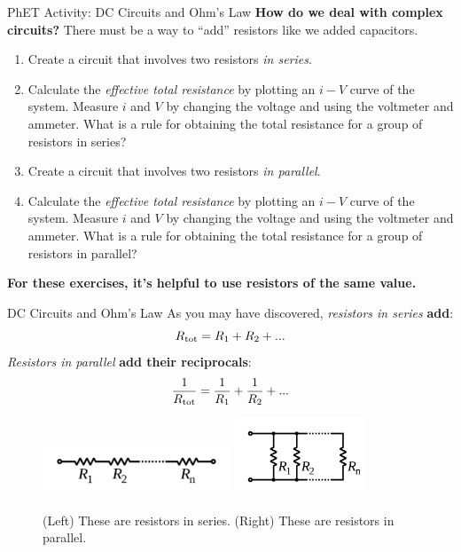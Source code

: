 \documentclass{beamer}
\begin{document}
\begin{frame}{PhET Activity: DC Circuits and Ohm's Law}
\small
\textbf{How do we deal with complex circuits?} There must be a way to ``add'' resistors like we added capacitors.
\begin{enumerate}
\item Create a circuit that involves two resistors \textit{in series}.
\item Calculate the \textit{effective total resistance} by plotting an $i-V$ curve of the system.  Measure $i$ and $V$ by changing the voltage and using the voltmeter and ammeter.  What is a rule for obtaining the total resistance for a group of resistors in series?
\item Create a circuit that involves two resistors \textit{in parallel}.
\item Calculate the \textit{effective total resistance} by plotting an $i-V$ curve of the system.  Measure $i$ and $V$ by changing the voltage and using the voltmeter and ammeter.   What is a rule for obtaining the total resistance for a group of resistors in parallel?
\end{enumerate}
\footnotesize
\textbf{For these exercises, it's helpful to use resistors of the same value.}
\end{frame}

\begin{frame}{DC Circuits and Ohm's Law}
As you may have discovered, \textit{resistors in series} \textbf{add}:
\begin{equation}
R_{\rm tot} = R_1 + R_2 + ...
\end{equation}
\textit{Resistors in parallel} \textbf{add their reciprocals}:
\begin{equation}
\frac{1}{R_{\rm tot}} = \frac{1}{R_1}+\frac{1}{R_2}+...
\end{equation}
\begin{figure}
\centering
\includegraphics[width=0.5\textwidth]{figures/series_resist.png}
\includegraphics[width=0.35\textwidth]{figures/parallel_resist.png}
\caption{\label{fig:series_parallel} (Left) These are resistors in series. (Right) These are resistors in parallel.}
\end{figure}
\end{frame}
\end{document}
